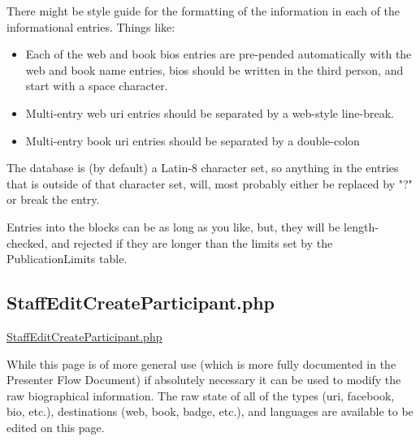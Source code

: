 \documentclass[captions=tablesignature]{scrartcl}
\begin{document}
There might be style guide for the formatting of the information in
each of the informational entries.  Things like:
\begin{itemize}
\item Each of the web and book bios entries are pre-pended
automatically with the web and book name entries, bios should be
written in the third person, and start with a space character.
\item Multi-entry web uri entries should be separated by a web-style
line-break.
\item Multi-entry book uri entries should be separated by a
double-colon
\end{itemize}

The database is (by default) a Latin-8 character set, so anything
in the entries that is outside of that character set, will, most
probably either be replaced by "?" or break the entry.

Entries into the blocks can be as long as you like, but, they will
be length-checked, and rejected if they are longer than the limits
set by the PublicationLimits table.

\subsection{StaffEditCreateParticipant.php}
\label{sec-3-3}
\label{StaffEditCreateParticipant.php}
\underline{
\href{../webpages/StaffEditCreateParticipant.php?action=edit}{StaffEditCreateParticipant.php}
}

While this page is of more general use (which is more fully
documented in the Presenter Flow Document) if absolutely necessary
it can be used to modify the raw biographical information. The raw
state of all of the types (uri, facebook, bio, etc.), destinations
(web, book, badge, etc.), and languages are available to be edited
on this page.
\end{document}
